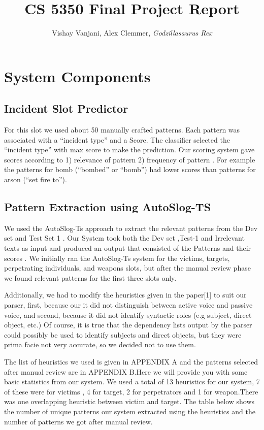 \documentclass[11pt]{myclass}
\title{CS 5350 Final Project Report}
\author{Vishay Vanjani, Alex Clemmer, \textit{Godzillasaurus Rex}}
\begin{document}
\maketitle

\section{System Components}

\subsection*{Incident Slot Predictor}
For this slot we used about 50 manually crafted patterns. Each pattern was associated with a “incident type” and a Score. The classifier selected the “incident type” with max score to make the prediction. Our scoring system gave scores according to 1) relevance of pattern 2) frequency of pattern . For example the patterns for bomb (“bombed” or “bomb”) had lower scores than patterns for arson (“set fire to”).

\subsection*{Pattern Extraction using AutoSlog-TS}

We used the AutoSlog-Ts approach to extract the relevant patterns from the Dev set and Test Set 1 . Our System took both the Dev set ,Test-1 and Irrelevant texts as input and produced an output that consisted of the Patterns and their scores . We initially ran the AutoSlog-Ts system for the victims, targets, perpetrating individuals, and weapons slots, but after the manual review phase we found relevant patterns for the first three slots only.

Additionally, we had to modify the heuristics given in the paper[1] to suit our parser, first, because our it did not distinguish between active voice and passive voice, and second, because it did not identify syntactic roles (e.g subject, direct object, etc.) Of course, it is true that the dependency lists output by the parser could possibly be used to identify subjects and direct objects, but they were prima facie not very accurate, so we decided not to use them.

The list of heuristics we used is given in APPENDIX A and the patterns selected after manual review are in APPENDIX B.Here we will provide you with some basic statistics from our system. We used a total of 13 heuristics for our system, 7 of these  were for victims , 4 for target, 2 for perpetrators and 1 for weapon.There was one overlapping heuristic between victim and target. The table below shows the number of unique patterns our system extracted using the heuristics and the number of patterns we got after manual review.
\end{document}
